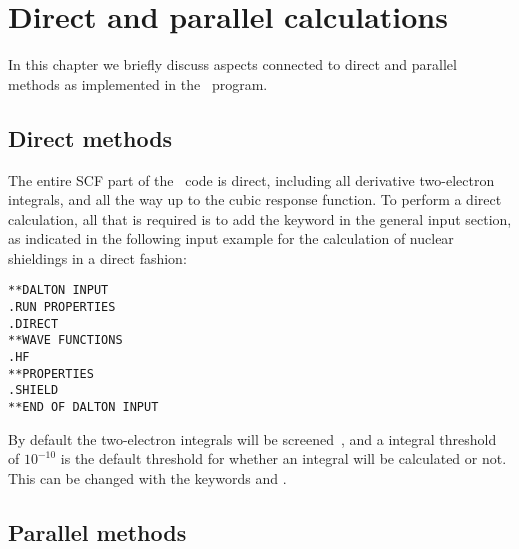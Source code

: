 \chapter{Direct and parallel calculations}\label{ch:dirpar}

In this chapter we briefly discuss aspects connected to
direct and parallel
methods as implemented in the \siraba\ program. 

\section{Direct methods}\label{sec:direct}

\begin{center}
\end{center}

The entire SCF part
of the \siraba\ code is direct, including all derivative two-electron
integrals, and all the way up to the cubic response function. To
perform a direct calculation, all that is
required is to add the 
keyword  in the general input section, as indicated in the
following input example for the calculation of nuclear
shieldings in a
direct fashion:

\begin{verbatim}
**DALTON INPUT
.RUN PROPERTIES
.DIRECT
**WAVE FUNCTIONS
.HF
**PROPERTIES
.SHIELD
**END OF DALTON INPUT
\end{verbatim}

By default the two-electron integrals will be
screened~\cite{krdjpnhatshjajpdthjcp108}, and a integral 
threshold of $10^{-10}$ is the default threshold for whether an
integral will be calculated or not. This can be changed with the
keywords  and .

\section{Parallel methods}\label{sec:parallel}

